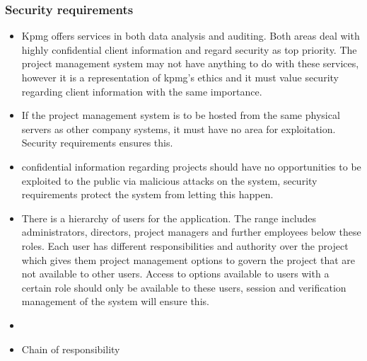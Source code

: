 \documentclass[a4paper,12pt]{article}
\begin{document}
\subsubsection{Security requirements}
    \begin{itemize}
        \item Kpmg offers services in both data analysis and auditing. Both areas deal with highly confidential client information and regard security as top priority. The project management system may not have anything to do with these services, however it is a representation of kpmg's ethics and it must value security regarding client information with the same importance.
        
        \item If the project management system is to be hosted from the same physical servers as other company systems, it must have no area for exploitation. Security requirements ensures this.
        
        \item confidential information regarding projects should have no opportunities to be exploited to the public via malicious attacks on the system, security requirements protect the system from letting this happen.  
    \end{itemize}
    
    \begin{itemize}
        \item There is a hierarchy of users for the application. The range includes administrators, directors, project managers and further employees below these roles. Each user has different responsibilities and authority over the project which gives them project management options to govern the project that are not available to other users. Access to options available to users with a certain role should only be available to these users, session and verification management of the system will ensure this.
        
        \item 
    \end{itemize}
    
    \begin{itemize}
    \item Chain of responsibility
    \end{itemize}
    
\end{document}
